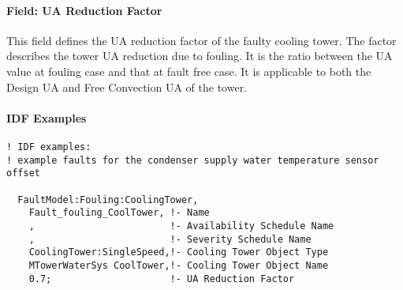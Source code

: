 \paragraph{Field: UA Reduction Factor}\label{field-ua-reduction-factor}

This field defines the UA reduction factor of the faulty cooling tower. The factor describes the tower UA reduction due to fouling. It is the ratio between the UA value at fouling case and that at fault free case. It is applicable to both the Design UA and Free Convection UA of the tower.

\paragraph{IDF Examples}

\begin{lstlisting}
! IDF examples:
! example faults for the condenser supply water temperature sensor offset

  FaultModel:Fouling:CoolingTower,
    Fault_fouling_CoolTower, !- Name
    ,                        !- Availability Schedule Name
    ,                        !- Severity Schedule Name
    CoolingTower:SingleSpeed,!- Cooling Tower Object Type
    MTowerWaterSys CoolTower,!- Cooling Tower Object Name
    0.7;                     !- UA Reduction Factor

\end{lstlisting}